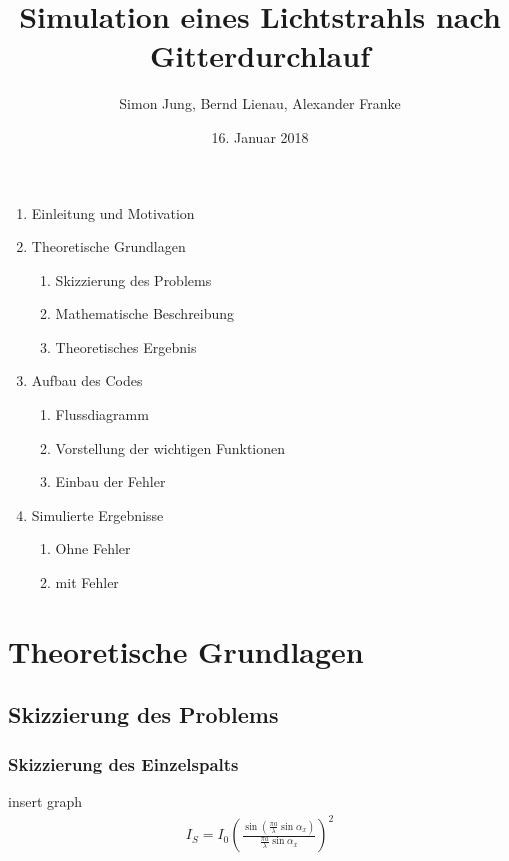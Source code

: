 \documentclass{beamer}
\title{Simulation eines Lichtstrahls nach Gitterdurchlauf}
\author{Simon Jung, Bernd Lienau, Alexander Franke}
\date{16. Januar 2018}
\begin{document}
\begin{frame}
\maketitle
\end{frame}


\begin{frame}
\begin{enumerate}
\item	Einleitung und Motivation
\item	Theoretische Grundlagen
	\begin{enumerate}
	\item	Skizzierung des Problems
	\item	Mathematische Beschreibung
	\item	Theoretisches Ergebnis
	\end{enumerate}
\item	Aufbau des Codes
	\begin{enumerate}
	\item	Flussdiagramm
	\item	Vorstellung der wichtigen Funktionen
	\item	Einbau der Fehler
	\end{enumerate}
\item	Simulierte Ergebnisse
	\begin{enumerate}
	\item	Ohne Fehler
	\item	mit Fehler
	\end{enumerate}
\end{enumerate}

\end{frame}



\section{Theoretische Grundlagen}
\subsection{Skizzierung des Problems}
\begin{frame}
  \frametitle{Skizzierung des Einzelspalts}

insert graph\\

\begin{align*}
I_S = I_0 \left( \frac{\sin\left(\frac{\pi a}{\lambda}\sin \alpha_x\right)}{\frac{\pi a}{\lambda} \sin \alpha_x} \right)^2
\end{align*}





\end{frame}
\end{document}
